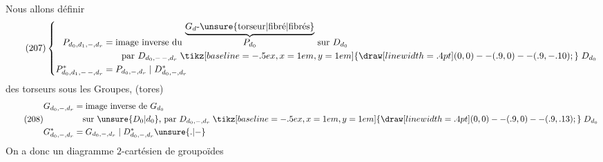 Nous allons définir
\[
\tag{207}
\left\{\begin{aligned}
P_{d_0,d_1,-,d_r}&=\text{image inverse du }\overset{\underbrace{G_d\text{-}\unsure{\text{torseur}|\text{fibré}|\text{fibrés}}}}{P_{d_0}}\text{ sur }D_{d_0}\\
&\qquad\text{par }D_{d_0,\mathord{-\, -},d_r}\mathrel{\tikz[baseline=-.5ex,x=1em,y=1em]{\draw[line width=.4pt] (0,0)--(.9,0)--(.9,-.10);}} D_{d_0}\\
P^*_{d_0,d_1,\mathord{-\, -},d_r}&=P_{d_0,-,d_r}\mid D^*_{d_0,-,d_r}
\end{aligned}\right.
\]
 des torseurs sous les Groupes, 
(tores)
\[
\tag{208}
\begin{aligned}
G_{d_0,-,d_r}&=\text{image inverse de }G_{d_0}\\
&\quad\text{sur }\unsure{D_0|d_0}\text{, par }D_{d_0,-,d_r}\mathrel{\tikz[baseline=-.5ex,x=1em,y=1em]{\draw[line width=.4pt] (0,0)--(.9,0)--(.9,.13);}} D_{d_0}\\
G^*_{d_0,-,d_r}&=G_{d_0,-,d_r}\mid D^*_{d_0,-,d_r}\unsure{.|-}
\end{aligned}
\]
On a donc un diagramme $2$-cartésien de groupoïdes

